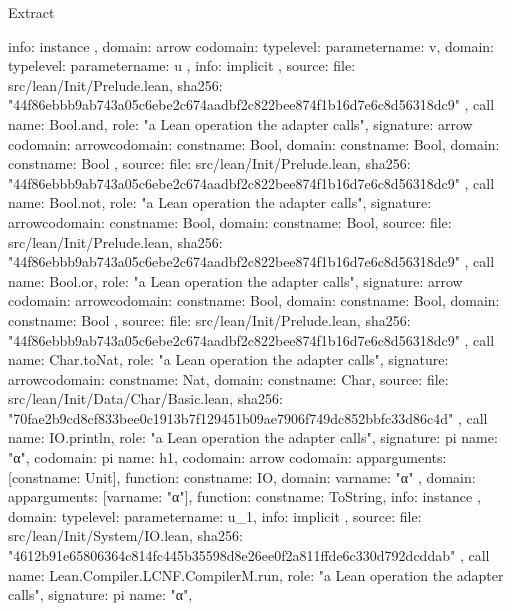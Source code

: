 \begin{lexlean}{Extract}
\begin{toolingmodule}
{{{{          info: instance
        },
        domain: arrow{
          codomain: type{level: parameter{name: v}},
          domain: type{level: parameter{name: u}}
        },
        info: implicit
      },
      source: {
        file: src/lean/Init/Prelude.lean,
        sha256: "44f86ebbb9ab743a05c6ebe2c674aadbf2c822bee874f1b16d7e6c8d56318dc9"
      }
    },
    call{
      name: Bool.and,
      role: "a Lean operation the adapter calls",
      signature: arrow{
        codomain: arrow{codomain: const{name: Bool}, domain: const{name: Bool}},
        domain: const{name: Bool}
      },
      source: {
        file: src/lean/Init/Prelude.lean,
        sha256: "44f86ebbb9ab743a05c6ebe2c674aadbf2c822bee874f1b16d7e6c8d56318dc9"
      }
    },
    call{
      name: Bool.not,
      role: "a Lean operation the adapter calls",
      signature: arrow{codomain: const{name: Bool}, domain: const{name: Bool}},
      source: {
        file: src/lean/Init/Prelude.lean,
        sha256: "44f86ebbb9ab743a05c6ebe2c674aadbf2c822bee874f1b16d7e6c8d56318dc9"
      }
    },
    call{
      name: Bool.or,
      role: "a Lean operation the adapter calls",
      signature: arrow{
        codomain: arrow{codomain: const{name: Bool}, domain: const{name: Bool}},
        domain: const{name: Bool}
      },
      source: {
        file: src/lean/Init/Prelude.lean,
        sha256: "44f86ebbb9ab743a05c6ebe2c674aadbf2c822bee874f1b16d7e6c8d56318dc9"
      }
    },
    call{
      name: Char.toNat,
      role: "a Lean operation the adapter calls",
      signature: arrow{codomain: const{name: Nat}, domain: const{name: Char}},
      source: {
        file: src/lean/Init/Data/Char/Basic.lean,
        sha256: "70fae2b9cd8cf833bee0c1913b7f129451b09ae7906f749dc852bbfc33d86c4d"
      }
    },
    call{
      name: IO.println,
      role: "a Lean operation the adapter calls",
      signature: pi{
        name: "α",
        codomain: pi{
          name: h1,
          codomain: arrow{
            codomain: app{arguments: [const{name: Unit}], function: const{name: IO}},
            domain: var{name: "α"}
          },
          domain: app{arguments: [var{name: "α"}], function: const{name: ToString}},
          info: instance
        },
        domain: type{level: parameter{name: u_1}},
        info: implicit
      },
      source: {
        file: src/lean/Init/System/IO.lean,
        sha256: "4612b91e65806364c814fc445b35598d8e26ee0f2a811ffde6c330d792dcddab"
      }
    },
    call{
      name: Lean.Compiler.LCNF.CompilerM.run,
      role: "a Lean operation the adapter calls",
      signature: pi{
        name: "α",
}}}
\end{toolingmodule}
\end{lexlean}
